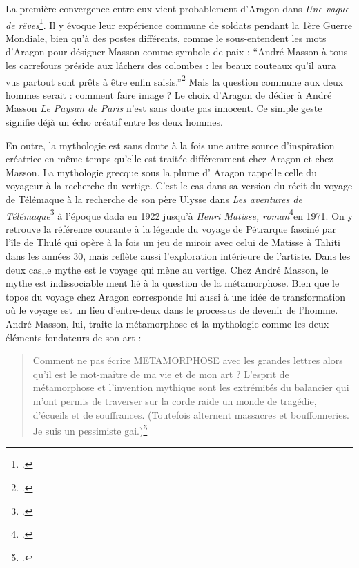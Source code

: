 La première convergence entre eux vient probablement d’Aragon dans \emph{Une vague de rêves}\footcite{vaguedereves}. Il y évoque leur expérience commune de soldats pendant la 1ère Guerre Mondiale, bien qu’à des postes différents, comme le sous-entendent les mots d’Aragon pour désigner Masson comme symbole de paix : \enquote{André Masson à tous les carrefours préside aux lâchers des colombes : les beaux couteaux qu’il aura vus partout sont prêts à être enfin saisis.}\footcite[p28]{vaguedereves} Mais la question commune aux deux hommes serait : comment faire image ? Le choix d'Aragon de dédier à André Masson  \emph{Le Paysan de Paris } n'est sans doute pas innocent. Ce simple geste signifie déjà un écho créatif entre les deux hommes.

En outre, la mythologie est sans doute à la fois une autre source d’inspiration créatrice en même temps qu’elle est traitée différemment chez Aragon et chez Masson.  La mythologie grecque sous la plume d’ Aragon rappelle celle du voyageur à la recherche du vertige. C’est le cas dans sa version du récit du voyage de Télémaque à la recherche de son père Ulysse dans \emph{Les aventures de Télémaque}\footcite{telemaque} à l’époque dada en 1922 jusqu’à \emph{Henri Matisse, roman}\footcite{aragonmatisse}en 1971. On y retrouve la référence courante à la légende du voyage de Pétrarque fasciné par l’île de Thulé qui opère à la fois un jeu de miroir avec celui de Matisse à Tahiti dans les années 30, mais reflète aussi l’exploration intérieure de l’artiste. Dans les deux cas,le mythe est le voyage qui mène au vertige. Chez André Masson, le mythe est indissociable ment lié à la question de la métamorphose. Bien que le topos du voyage chez Aragon corresponde lui aussi à une idée de transformation où le voyage est un lieu d’entre-deux dans le processus de devenir de l’homme. André Masson, lui, traite la métamorphose et la mythologie comme les deux éléments fondateurs de son art : 
\begin{quote}
Comment ne pas écrire METAMORPHOSE avec les grandes lettres alors qu’il est le mot-maître de ma vie et de mon art ? L’esprit de métamorphose et l’invention mythique sont les extrémités du balancier qui m’ont permis de traverser sur la corde raide un monde de tragédie, d’écueils et de souffrances. (Toutefois alternent massacres et bouffonneries. Je suis un pessimiste gai.)\footcite[p8]{memoiremonde}\end{quote}

